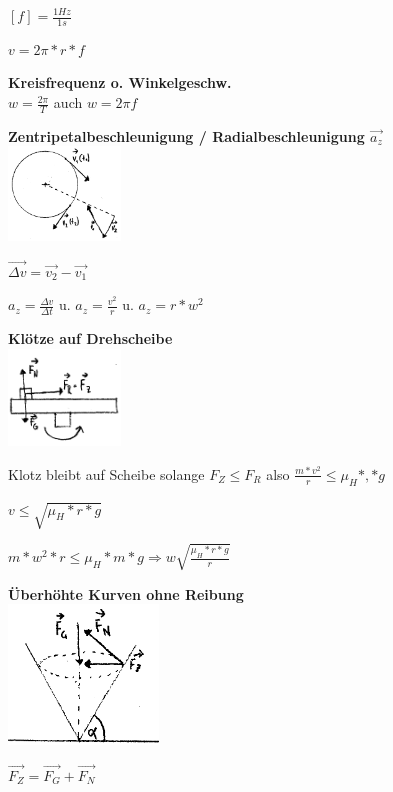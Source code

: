 \documentclass[a4paper,9pt]{article}
\begin{document}
\begin{multicols}{4}
	$ [f] = \frac{1Hz}{1s} $
	
	$ v = 2\pi * r * f $
	
	

\textbf{Kreisfrequenz o. Winkelgeschw.}\\
	
	$ w = \frac{2\pi}{T} $ auch $ w = 2\pi f $
	
	

\textbf{Zentripetalbeschleunigung / Radialbeschleunigung $ \vec{a_z} $ }\\
	\includegraphics[width=3cm]{gr3}
	
	$ \vec{\Delta v} = \vec{v_2} - \vec{v_1} $
	
	$ a_z = \frac{\Delta v}{\Delta t} $ u. $ a_z = \frac{v^2}{r} $ u. $ a_z = r*w^2 $
	
	

\textbf{Klötze auf Drehscheibe}\\
	
	\includegraphics[width=3cm]{gr4}
	
	Klotz bleibt auf Scheibe solange $ F_Z \le F_R $ also $ \frac{m * v^2}{r} \le \mu_H * , * g $
	
	$ v \le \sqrt{\mu_H * r * g} $
	
	$ m * w^2 * r \le \mu_H * m * g \Rightarrow w \sqrt{\frac{\mu_H * r *g}{r}} $
	
	

\textbf{Überhöhte Kurven ohne Reibung}\\
	\includegraphics[width=4cm]{gr5}
	
	$ \vec{F_Z}  = \vec{F_G} + \vec{F_N} $
	

\end{multicols}
\end{document}
